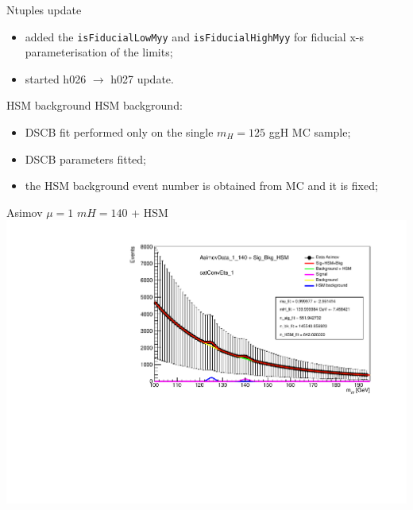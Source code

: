 \documentclass[10pt,UKenglish, leqno, xcolor = dvipsnames]{beamer}
\begin{document}
		\begin{frame}{Ntuples update}
			\vfill
			\begin{itemize}
				\item added the \texttt{isFiducialLowMyy} and \texttt{isFiducialHighMyy} for fiducial x-s parameterisation of the limits;
				\vspace{1cm}
				\item started h026 $\to$ h027 update.
			\end{itemize}
			\vfill
		\end{frame}
	
		\begin{frame}{HSM background}
			\vfill
			HSM background:
			\begin{itemize}
				\item DSCB fit performed only on the single $m_H = 125$ ggH MC sample;
				\item DSCB parameters fitted;
				\item the HSM background event number is obtained from MC and it is fixed;
			\end{itemize}
			\vfill
		\end{frame}
		
		\begin{frame}{Asimov $\mu=1$ $mH=140$ + HSM}
			\vfill
			\centering
			\includegraphics[width=\textwidth]{../images/week_14/HSM_AsimovData_1_140_catConvEta_1.pdf}
			\vfill
		\end{frame}
	
\end{document}
